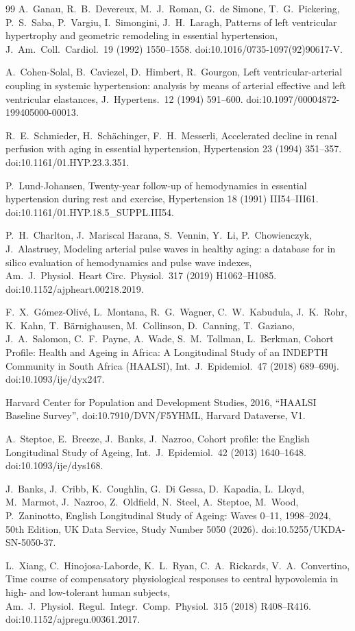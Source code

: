 \documentclass[preprint,12pt,nopreprintline]{elsarticle}
\begin{document}
\begin{thebibliography}{99}
  A.~Ganau, R.~B.~Devereux, M.~J.~Roman, G.~de Simone, T.~G.~Pickering,
  P.~S.~Saba, P.~Vargiu, I.~Simongini, J.~H.~Laragh,
  Patterns of left ventricular hypertrophy and geometric remodeling in essential hypertension,
  J.\ Am.\ Coll.\ Cardiol.\ 19 (1992) 1550--1558. doi:10.1016/0735-1097(92)90617-V.

  A.~Cohen-Solal, B.~Caviezel, D.~Himbert, R.~Gourgon,
  Left ventricular-arterial coupling in systemic hypertension: analysis by means of arterial effective and left ventricular elastances,
  J.\ Hypertens.\ 12 (1994) 591--600. doi:10.1097/00004872-199405000-00013.

  R.~E.~Schmieder, H.~Sch\"achinger, F.~H.~Messerli,
  Accelerated decline in renal perfusion with aging in essential hypertension,
  Hypertension 23 (1994) 351--357. doi:10.1161/01.HYP.23.3.351.

  P.~Lund-Johansen,
  Twenty-year follow-up of hemodynamics in essential hypertension during rest and exercise,
  Hypertension 18 (1991) III54--III61. doi:10.1161/01.HYP.18.5\_SUPPL.III54.

  P.~H.~Charlton, J.~Mariscal Harana, S.~Vennin, Y.~Li, P.~Chowienczyk, J.~Alastruey,
  Modeling arterial pulse waves in healthy aging: a database for in silico evaluation of hemodynamics and pulse wave indexes,
  Am.\ J.\ Physiol.\ Heart Circ.\ Physiol.\ 317 (2019) H1062--H1085. doi:10.1152/ajpheart.00218.2019.

  F.~X.~G\'omez-Oliv\'e, L.~Montana, R.~G.~Wagner, C.~W.~Kabudula, J.~K.~Rohr,
  K.~Kahn, T.~B\"arnighausen, M.~Collinson, D.~Canning, T.~Gaziano,
  J.~A.~Salomon, C.~F.~Payne, A.~Wade, S.~M.~Tollman, L.~Berkman,
  Cohort Profile: Health and Ageing in Africa: A Longitudinal Study of an INDEPTH Community in South Africa (HAALSI),
  Int.\ J.\ Epidemiol.\ 47 (2018) 689--690j. doi:10.1093/ije/dyx247.

  Harvard Center for Population and Development Studies, 2016,
  ``HAALSI Baseline Survey'', doi:10.7910/DVN/F5YHML, Harvard Dataverse, V1.

  A.~Steptoe, E.~Breeze, J.~Banks, J.~Nazroo,
  Cohort profile: the English Longitudinal Study of Ageing,
  Int.\ J.\ Epidemiol.\ 42 (2013) 1640--1648. doi:10.1093/ije/dys168.

  J.~Banks, J.~Cribb, K.~Coughlin, G.~Di Gessa, D.~Kapadia, L.~Lloyd,
  M.~Marmot, J.~Nazroo, Z.~Oldfield, N.~Steel, A.~Steptoe, M.~Wood,
  P.~Zaninotto,
  English Longitudinal Study of Ageing: Waves 0--11, 1998--2024,
  50th Edition, UK Data Service, Study Number 5050 (2026).
  doi:10.5255/UKDA-SN-5050-37.

  L.~Xiang, C.~Hinojosa-Laborde, K.~L.~Ryan, C.~A.~Rickards, V.~A.~Convertino,
  Time course of compensatory physiological responses to central hypovolemia in high- and low-tolerant human subjects,
  Am.\ J.\ Physiol.\ Regul.\ Integr.\ Comp.\ Physiol.\ 315 (2018) R408--R416. doi:10.1152/ajpregu.00361.2017.

\end{thebibliography}
\end{document}
